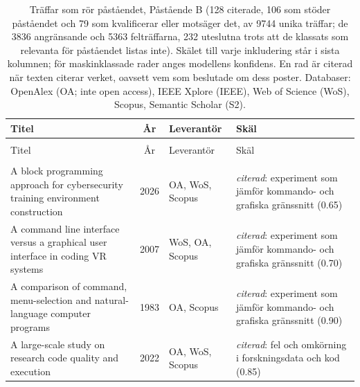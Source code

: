 
\begingroup\footnotesize
\begin{longtable}{@{}%
  >{\raggedright\arraybackslash}p{}c%
  >{\raggedright\arraybackslash}p{}%
  >{\raggedright\arraybackslash}p{}@{}}
\caption{Träffar som rör påståendet, Påstående B (128 citerade, 106 som stöder påståendet och 79 som kvalificerar eller motsäger det, av 9744 unika träffar; de 3836 angränsande och 5363 felträffarna, 232 uteslutna trots att de klassats som relevanta för påståendet listas inte). Skälet till varje inkludering står i sista kolumnen; för maskinklassade rader anges modellens konfidens. En rad är citerad när texten citerar verket, oavsett vem som beslutade om dess poster. Databaser: OpenAlex (OA; inte open access), IEEE Xplore (IEEE), Web of Science (WoS), Scopus, Semantic Scholar (S2).}\label{tab:sok-cli-efficiency}\\
\toprule
Titel & År & Leverantör & Skäl \\
\midrule
\endfirsthead
\multicolumn{4}{@{}l}{\emph{\tablename~\thetable{} (forts.)}}\\
\toprule
Titel & År & Leverantör & Skäl \\
\midrule
\endhead
\midrule \multicolumn{4}{r@{}}{\emph{forts.\ på nästa sida}}\\
\endfoot
\bottomrule
\endlastfoot
A block programming approach for cybersecurity training environment construction & 2026 & OA, WoS, Scopus & \emph{citerad}: experiment som jämför kommando- och grafiska gränssnitt (0.65) \\
A command line interface versus a graphical user interface in coding VR systems & 2007 & WoS, OA, Scopus & \emph{citerad}: experiment som jämför kommando- och grafiska gränssnitt (0.70) \\
A comparison of command, menu-selection and natural-language computer programs & 1983 & OA, Scopus & \emph{citerad}: experiment som jämför kommando- och grafiska gränssnitt (0.90) \\
A large-scale study on research code quality and execution & 2022 & OA, WoS, Scopus & \emph{citerad}: fel och omkörning i forskningsdata och kod (0.85) \\

\end{longtable}
